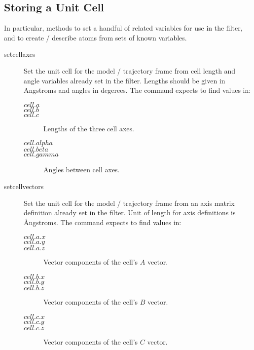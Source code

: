 \subsection{Storing a Unit Cell}
In particular, methods to set a handful of related variables for use in the filter, and to create / describe atoms from sets of known variables.\\
\begin{description}

	\item[setcellaxes\its]
	Set the unit cell for the model / trajectory frame from cell length and angle variables already set in the filter. Lengths should be given in Angstroms and angles in degerees. The command expects to find values in:
	\begin{description}
		\item[$cell.a$]
		\item[$cell.b$]
		\item[$cell.c$\its]
			Lengths of the three cell axes.
		\item[$cell.alpha$]
		\item[$cell.beta$]
		\item[$cell.gamma$\its]
			Angles between cell axes.
	\end{description}

	\item[setcellvectors\its]
	Set the unit cell for the model / trajectory frame from an axis matrix definition already set in the filter. Unit of length for axis definitions is \AA{}ngstroms. The command expects to find values in:
	\begin{description}
		\item[$cell.a.x$]
		\item[$cell.a.y$]
		\item[$cell.a.z$\its]
			Vector components of the cell's $A$ vector.
		\item[$cell.b.x$]
		\item[$cell.b.y$]
		\item[$cell.b.z$\its]
			Vector components of the cell's $B$ vector.
		\item[$cell.c.x$]
		\item[$cell.c.y$]
		\item[$cell.c.z$\its]
			Vector components of the cell's $C$ vector.
	\end{description}


\end{description}


